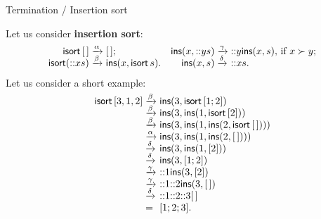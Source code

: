 %
\begin{frame}{Termination / Insertion sort}

  Let us consider \textbf{insertion sort}:
\begin{equation*}
\begin{array}{@{}r@{\;}l@{\;}lr@{\;}l@{\;}l@{}}
  \fun{isort}\,\el
& \smashedrightarrow{\alpha}
& \el;
& \fun{ins}(x, \cons{y}{s})
& \smashedrightarrow{\gamma}
& \cons{y}{\fun{ins}(x,s)}, \,\text{if \(x \succ y\)};\\
  \fun{isort}(\cons{x}{s})
& \smashedrightarrow{\beta}
& \fun{ins}(x,\fun{isort}\,s).
&  \fun{ins}(x,s)
& \smashedrightarrow{\delta}
& \cons{x}{s}.
\end{array}
\end{equation*}
Let us consider a short example:
\begin{equation*}
\begin{array}{r@{\;}l@{\;}l}
\fun{isort}\,[3,1,2]
& \smashedrightarrow{\beta} & \fun{ins}(3,\fun{isort}\,[1;2])\\
& \smashedrightarrow{\beta}
& \fun{ins}(3,\fun{ins}(1,\fun{isort}\,[2]))\\
& \smashedrightarrow{\beta}
& \fun{ins}(3,\fun{ins}(1,\fun{ins}(2,\fun{isort}\,\el)))\\
& \smashedrightarrow{\alpha}
& \fun{ins}(3,\fun{ins}(1,\fun{ins}(2,\el)))\\
& \smashedrightarrow{\delta}
& \fun{ins}(3,\fun{ins}(1,[2]))\\
& \smashedrightarrow{\delta}
& \fun{ins}(3,[1;2])\\
& \smashedrightarrow{\gamma}
& \cons{1}{\fun{ins}(3,[2])}\\
& \smashedrightarrow{\gamma}
& \cons{1}{\cons{2}{\fun{ins}(3,\el)}}\\
& \smashedrightarrow{\delta}
& \cons{1}{\cons{2}{\cons{3}{\el}}}\\
& = & [1;2;3].
\end{array}
\end{equation*}

\end{frame}

